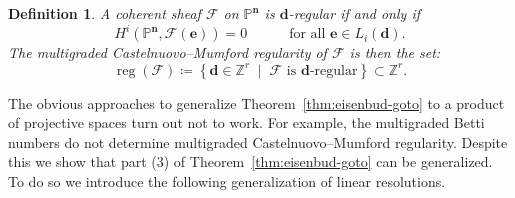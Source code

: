 \documentclass[11pt,reqno]{amsart}
\newtheorem{defn}[lemma]{Definition}
\theoremstyle{remark}
\newcommand{\reg}{\operatorname{reg}}
\newcommand{\Nef}{\operatorname{Nef}}
\newcommand{\dd}{\mathbf d}
\newcommand{\ee}{\mathbf e}
\newcommand{\nn}{\mathbf n}
\newcommand{\cF}{\mathcal{F}}
\renewcommand{\O}{\mathcal{O}}
\newcommand{\N}{\mathbb{N}}
\renewcommand{\P}{\mathbb{P}}
\newcommand{\Z}{\mathbb{Z}}
\begin{document}
\begin{defn}\label{def:mg-reg}
A coherent sheaf $\cF$ on $\P^{\nn}$ is $\dd$-regular if and only if
\[
H^i\left(\P^{\nn}, \cF(\ee)\right) =0 \quad \quad \quad \text{for all $\ee\in L_{i}(\dd)$}.
\]
The multigraded Castelnuovo--Mumford regularity of $\cF$ is then the set: 
\[
\reg(\cF) \coloneqq \left \{ \dd\in \Z^{r} \;\; \big| \;\; \text{$\cF$ is $\dd$-regular}\right\}\subset \Z^{r}.
\]
\end{defn}



The obvious approaches to generalize Theorem~\ref{thm:eisenbud-goto} to a product of projective spaces turn out not to work. For example, the multigraded Betti numbers do not determine multigraded Castelnuovo--Mumford regularity. Despite this we show that part (3) of Theorem~\ref{thm:eisenbud-goto} can be generalized. To do so we introduce the following generalization of linear resolutions. 
\end{document}
